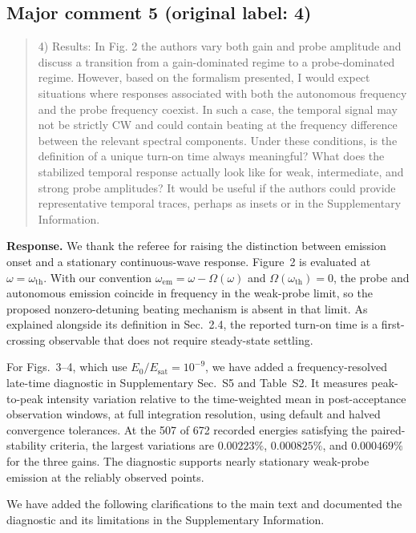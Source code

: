 \documentclass[11pt,a4paper]{article}
\newcommand{\reviewercomment}[1]{\begin{quote}\small #1\end{quote}}
\newcommand{\response}[1]{\par\textbf{Response.} #1\par}
\begin{document}
\subsection*{Major comment 5 (original label: 4)}
\label{r1-major-5}
\reviewercomment{
4) Results: In Fig. 2 the authors vary both gain and probe amplitude and discuss a transition from a gain-dominated regime to a probe-dominated regime. However, based on the formalism presented, I would expect situations where responses associated with both the autonomous frequency and the probe frequency coexist. In such a case, the temporal signal may not be strictly CW and could contain beating at the frequency difference between the relevant spectral components. Under these conditions, is the definition of a unique turn-on time always meaningful? What does the stabilized temporal response actually look like for weak, intermediate, and strong probe amplitudes? It would be useful if the authors could provide representative temporal traces, perhaps as insets or in the Supplementary Information.
}
\response{We thank the referee for raising the distinction between emission onset and a stationary continuous-wave response. Figure~2 is evaluated at $\omega=\omega_{\mathrm{th}}$. With our convention $\omega_{\mathrm{em}}=\omega-\Omega(\omega)$ and $\Omega(\omega_{\mathrm{th}})=0$, the probe and autonomous emission coincide in frequency in the weak-probe limit, so the proposed nonzero-detuning beating mechanism is absent in that limit. As explained alongside its definition in Sec.~2.4, the reported turn-on time is a first-crossing observable that does not require steady-state settling.

For Figs.~3--4, which use $E_0/E_{\mathrm{sat}}=10^{-9}$, we have added a frequency-resolved late-time diagnostic in Supplementary Sec.~S5 and Table~S2. It measures peak-to-peak intensity variation relative to the time-weighted mean in post-acceptance observation windows, at full integration resolution, using default and halved convergence tolerances. At the 507 of 672 recorded energies satisfying the paired-stability criteria, the largest variations are $0.00223\%$, $0.000825\%$, and $0.000469\%$ for the three gains. The diagnostic supports nearly stationary weak-probe emission at the reliably observed points.

We have added the following clarifications to the main text and documented the diagnostic and its limitations in the Supplementary Information.}
\end{document}

